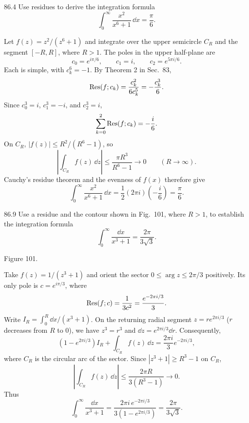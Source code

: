 \documentclass[11pt,oneside]{article}
\begin{document}

\begin{exercise}{86.4}
Use residues to derive the integration formula
\[
    \int_0^\infty\frac{x^2}{x^6+1}\,\dd x=\frac\pi6.
\]
\end{exercise}

\begin{solution}
Let $f(z)=z^2/(z^6+1)$ and integrate over the upper semicircle $C_R$ and the segment $[-R,R]$, where $R>1$. The poles in the upper half-plane are
\[
    c_0=e^{i\pi/6},\qquad c_1=i,\qquad c_2=e^{5\pi i/6}.
\]
Each is simple, with $c_k^6=-1$. By Theorem 2 in Sec.~83,
\[
    \operatorname{Res}(f; c_k)=\frac{c_k^2}{6c_k^5}
        =-\frac{c_k^3}{6}.
\]
Since $c_0^3=i$, $c_1^3=-i$, and $c_2^3=i$,
\[
    \sum_{k=0}^2\operatorname{Res}(f; c_k)=-\frac i6.
\]
On $C_R$, $|f(z)|\le R^2/(R^6-1)$, so
\[
    \left|\int_{C_R}f(z)\,\dd z\right|
    \le\frac{\pi R^3}{R^6-1}\longrightarrow0
    \qquad(R\to\infty).
\]
Cauchy's residue theorem and the evenness of $f(x)$ therefore give
\[
    \boxed{\int_0^\infty\frac{x^2}{x^6+1}\,\dd x
    =\frac12(2\pi i)\left(-\frac i6\right)=\frac\pi6.}
\]
\end{solution}

\begin{exercise}{86.9}
Use a residue and the contour shown in Fig.~101, where $R>1$, to establish the integration formula
\[
    \int_0^\infty\frac{\dd x}{x^3+1}=\frac{2\pi}{3\sqrt3}.
\]
\begin{center}
\par\small Figure 101.
\end{center}
\end{exercise}

\begin{solution}
Take $f(z)=1/(z^3+1)$ and orient the sector $0\le\arg z\le2\pi/3$ positively. Its only pole is $c=e^{i\pi/3}$, where
\[
    \operatorname{Res}(f;c)=\frac1{3c^2}=\frac{e^{-2\pi i/3}}3.
\]
Write $I_R=\int_0^R\dd x/(x^3+1)$. On the returning radial segment $z=re^{2\pi i/3}$ ($r$ decreases from $R$ to $0$), we have $z^3=r^3$ and $\dd z=e^{2\pi i/3}\dd r$. Consequently,
\[
    (1-e^{2\pi i/3})I_R+\int_{C_R}f(z)\,\dd z
    =\frac{2\pi i}{3}e^{-2\pi i/3},
\]
where $C_R$ is the circular arc of the sector. Since $|z^3+1|\ge R^3-1$ on $C_R$,
\[
    \left|\int_{C_R}f(z)\,\dd z\right|
    \le\frac{2\pi R}{3(R^3-1)}\longrightarrow0.
\]
Thus
\[
    \boxed{\int_0^\infty\frac{\dd x}{x^3+1}
    =\frac{2\pi i\,e^{-2\pi i/3}}{3(1-e^{2\pi i/3})}
    =\frac{2\pi}{3\sqrt3}.}
\]
\end{solution}
\end{document}
